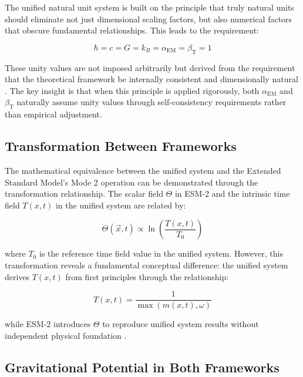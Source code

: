 \documentclass[12pt,a4paper]{article}
\newcommand{\Tfieldt}{T(x,t)}
\newcommand{\alphaEM}{\alpha_{\text{EM}}}
\newcommand{\betaT}{\beta_{\text{T}}}
\newcommand{\Tzero}{T_0}
\newcommand{\vecx}{\vec{x}}
\begin{document}
	The unified natural unit system is built on the principle that truly natural units should eliminate not just dimensional scaling factors, but also numerical factors that obscure fundamental relationships. This leads to the requirement:
	
	\begin{equation}
		\hbar = c = G = k_B = \alphaEM = \betaT = 1
	\end{equation}
	
	These unity values are not imposed arbitrarily but derived from the requirement that the theoretical framework be internally consistent and dimensionally natural \cite{pascher_beta_derivation_2025}. The key insight is that when this principle is applied rigorously, both $\alphaEM$ and $\betaT$ naturally assume unity values through self-consistency requirements rather than empirical adjustment.
	
	\subsection{Transformation Between Frameworks}
	\label{subsec:transformation}
	
	The mathematical equivalence between the unified system and the Extended Standard Model's Mode 2 operation can be demonstrated through the transformation relationship. The scalar field $\Theta$ in ESM-2 and the intrinsic time field $\Tfieldt$ in the unified system are related by:
	
	\begin{equation}
		\Theta(\vecx,t) \propto \ln\left(\frac{\Tfieldt}{\Tzero}\right)
	\end{equation}
	
	where $\Tzero$ is the reference time field value in the unified system. However, this transformation reveals a fundamental conceptual difference: the unified system derives $\Tfieldt$ from first principles through the relationship:
	
	\begin{equation}
		\Tfieldt = \frac{1}{\max(m(x,t), \omega)}
	\end{equation}
	
	while ESM-2 introduces $\Theta$ to reproduce unified system results without independent physical foundation \cite{pascher_lagrangian_2025}.
	
	\subsection{Gravitational Potential in Both Frameworks}
	\label{subsec:gravitational_potential}
	
\end{document}
